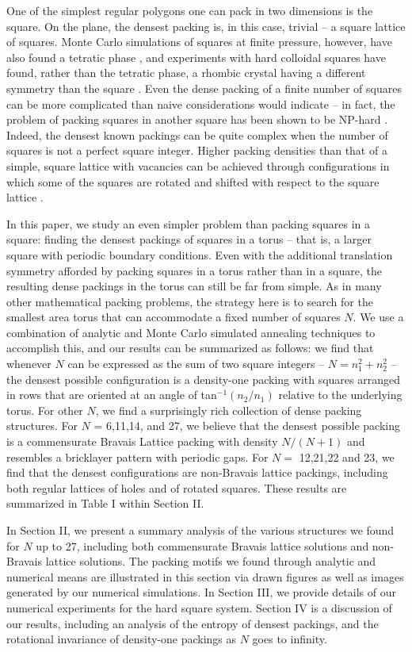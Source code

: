 \documentclass[aps]{revtex4}
\begin{document}
One of the simplest regular polygons one can pack in two dimensions is the square. On the plane, the densest packing is, in this case, trivial -- a square lattice of squares. Monte Carlo simulations of squares at finite pressure, however, have also found a tetratic phase \cite{Donev2006}, and experiments with hard colloidal squares have found, rather than the tetratic phase, a rhombic crystal having a different symmetry than the square \cite{Zhao2011}. Even the dense packing of a finite number of squares can be more complicated than naive considerations would indicate -- in fact, the problem of packing squares in another square has been shown to be NP-hard \cite{Leung1990}. Indeed, the densest known packings can be quite complex \cite{ERDOS1975,Friedman2002} when the number of squares is not a perfect square integer. Higher packing densities than that of a simple, square lattice with vacancies can be achieved through configurations in which some of the squares are rotated and shifted with respect to the square lattice \cite{Friedman2002}.

In this paper, we study an even simpler problem than packing squares in a square: finding the densest packings of squares in a torus -- that is, a larger square with periodic boundary conditions. Even with the additional translation symmetry afforded by packing squares in a torus rather than in a square, the resulting dense packings in the torus can still be far from simple. As in many other mathematical packing problems, the strategy here is to search for the smallest area torus that can accommodate a fixed number of squares $N$.  We use a combination of analytic and Monte Carlo simulated annealing techniques to accomplish this, and our results can be summarized as follows: we find that whenever $N$ can be expressed as the sum of two square integers -- $N=n_1^2+n_2^2$ -- the densest possible configuration is a density-one packing with squares arranged in rows that are oriented at an angle of tan$^{-1}(n_2/n_1)$ relative to the underlying torus.  For other $N$, we find a surprisingly rich collection of dense packing structures. For $N$ = 6,11,14, and 27, we believe that the densest possible packing is a commensurate Bravais Lattice packing with density $N/(N+1)$ and resembles a bricklayer pattern with periodic gaps.  For $N=$ 12,21,22 and 23, we find that the densest configurations are non-Bravais lattice packings, including both regular lattices of holes and of rotated squares. These results are summarized in Table I within Section II.

In Section II, we present a summary analysis of the various structures we found for $N$ up to 27, including both commensurate Bravais lattice solutions and non-Bravais lattice solutions.  The packing motifs we found through analytic and numerical means are illustrated in this section via drawn figures as well as images generated by our numerical simulations. In Section III, we provide details of our numerical experiments for the hard square system. Section IV is a discussion of our results, including an analysis of the entropy of densest packings, and the rotational invariance of density-one packings as $N$ goes to infinity. 
\end{document}
